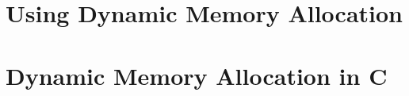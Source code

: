 
\clearpage
\section{Using Dynamic Memory Allocation} %
\label{sec:using_dynamic_memory_allocation}




\clearpage
\def\pageLang{c}
\section{Dynamic Memory Allocation in C} %
\label{sec:dynamic_memory_allocation_in_c}









\clearpage
\def\pageLang{none}
% 
% 
% 

